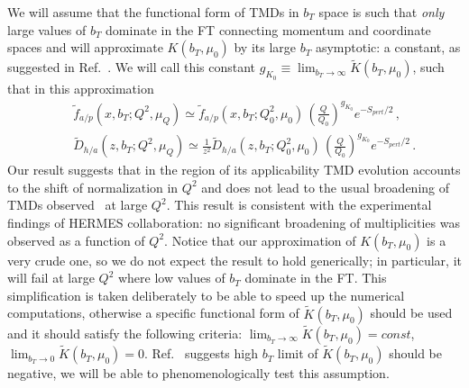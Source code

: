 \documentclass[final,3p,times,onecolumn,sort&compress,hidelinks]{elsarticle}
\newcommand\3[1]{\boldsymbol{#1}}
\begin{document}
We will assume that the functional form of TMDs in $b_T$ space is such that {\em only} large values of $b_T$  dominate in the FT connecting momentum and coordinate spaces and will approximate $K(b_T,\mu_0)$ by its large $b_T$ asymptotic: a constant, as suggested in Ref.~\cite{Collins:2014jpa}. We will
call this constant $g_{K_0}\equiv \lim_{b_T\to \infty} \tilde K(b_T,\mu_0)$, such that in this approximation
\begin{eqnarray}
&&\tilde f_{a/p} (x,b_T; Q^2, \mu_Q)\simeq \tilde f_{a/p} (x, b_T; Q_0^2, \mu_0)\,\left( \frac{Q}{Q_0}\right)^{g_{K_0}} e^{-S_{pert}/2}\,,
\nonumber \\[0.3cm]
&&\tilde D_{h/a}(z,b_T; Q^2, \mu_Q)\simeq \frac{1}{z^2}\tilde D_{h/a}(z, b_T; Q_0^2, \mu_0)\,\left( \frac{Q}{Q_0}\right)^{g_{K_0}}e^{-S_{pert}/2}\,.
\label{e:FF_ansatz1}
\end{eqnarray}
Our result suggests that in the region of its applicability TMD evolution accounts to the shift of normalization in $Q^2$ and does not lead to the usual broadening of TMDs observed~\cite{Collins:2011zzd} at large $Q^2$. This result is consistent with the experimental findings \cite{Airapetian:2012ki} of HERMES collaboration: no significant broadening of multiplicities was observed as a function of $Q^2$. Notice that our approximation of $K(b_T,\mu_0)$ is a very crude one, so we do not expect the result to hold generically; in particular, it will fail at large $Q^2$ where low values of $b_T$ dominate in the FT. This simplification is taken deliberately to be able to speed up the numerical computations, otherwise  a specific functional form of $\tilde K(b_T,\mu_0)$ should be used and it should satisfy the following criteria:
$\lim_{b_T\to \infty} \tilde K(b_T,\mu_0) = const$, $\lim_{b_T\to 0} \tilde K(b_T,\mu_0) = 0$. Ref.~\cite{Collins:2014jpa} suggests high $b_T$ limit of $\tilde K(b_T,\mu_0)$ should be negative, we will be able to phenomenologically test this assumption.
\end{document}
